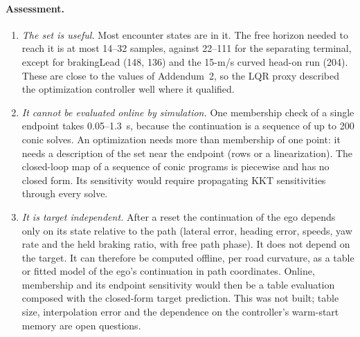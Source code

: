 \documentclass[11pt]{article}
\begin{document}
\paragraph{Assessment.}
\begin{enumerate}
\item \emph{The set is useful.} Most encounter states are in it. The free horizon
  needed to reach it is at most 14--32 samples, against 22--111 for the
  separating terminal, except for brakingLead (148, 136) and the 15-m/s curved
  head-on run (204). These are close to the values of Addendum~2, so the LQR
  proxy described the optimization controller well where it qualified.
\item \emph{It cannot be evaluated online by simulation.} One membership check
  of a single endpoint takes 0.05--1.3~s, because the continuation is a
  sequence of up to 200 conic solves. An optimization needs more than membership
  of one point: it needs a description of the set near the endpoint (rows or a
  linearization). The closed-loop map of a sequence of conic programs is
  piecewise and has no closed form. Its sensitivity would require propagating
  KKT sensitivities through every solve.
\item \emph{It is target independent.} After a reset the continuation of the ego
  depends only on its state relative to the path (lateral error, heading
  error, speeds, yaw rate and the held braking ratio, with free path phase).
  It does not depend on the target. It can therefore be computed offline, per
  road curvature, as a table or fitted model of the ego's continuation in path
  coordinates. Online, membership and its endpoint sensitivity would then be a
  table evaluation composed with the closed-form target prediction. This was
  not built; table size, interpolation error and the dependence on the
  controller's warm-start memory are open questions.
\end{enumerate}
\end{document}
